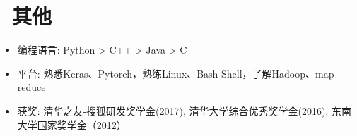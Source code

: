 \documentclass{resume}
\begin{document}
\section{\faCogs\ 其他}
\begin{itemize}[parsep=0.5ex]
  \item 编程语言: Python > C++ > Java > C
  \item 平台: 熟悉Keras、Pytorch，熟练Linux、Bash Shell，了解Hadoop、map-reduce
  \item 获奖: 清华之友-搜狐研发奖学金(2017), 清华大学综合优秀奖学金(2016), 东南大学国家奖学金（2012）
\end{itemize}

%
%
\end{document}
